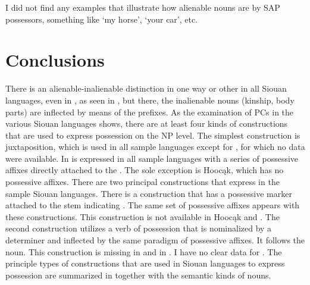 \documentclass[output=paper]{LSP/langsci}
\begin{document}
I did not find any examples that illustrate how alienable nouns are  by SAP possessors, something like `my horse', `your car', etc.

\section{Conclusions}
There is an alienable-inalienable distinction in one way or other in all Siouan languages, even in , as seen in , but there, the inalienable nouns (kinship, body parts) are inflected by means of the  prefixes. As the examination of PCs in the various Siouan languages shows, there are at least four kinds of constructions that are used to express possession on the NP level. The simplest construction is  juxtaposition, which is used in all sample languages except for , for which no data were available. In is expressed in all sample languages with a series of possessive affixes directly attached to the . The sole exception is Hoocąk, which has no possessive affixes. There are two principal constructions that express  in the sample Siouan languages. There is a construction that has a possessive marker attached to the stem indicating . The same set of possessive affixes appears with these constructions. This construction is not available in Hoocąk and . The second construction utilizes a verb of possession that is nominalized by a determiner and inflected by the same paradigm of possessive affixes. It follows the  noun. This construction is missing in  and in . I have no clear data for . The principle types of constructions that are used in Siouan languages to express possession are summarized in  together with the semantic kinds of  nouns. 
\end{document}
